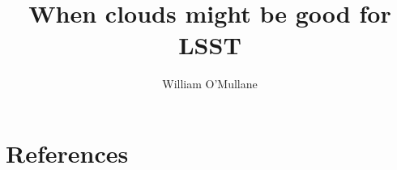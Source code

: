 \documentclass[DM,authoryear,toc]{lsstdoc}
\title{When  clouds might be good  for LSST}
\author{%
William O'Mullane
}
\date{\vcsDate}
\begin{document}
\maketitle


\appendix
\section{References} \label{sec:bib}


%
\printglossaries
\end{document}
